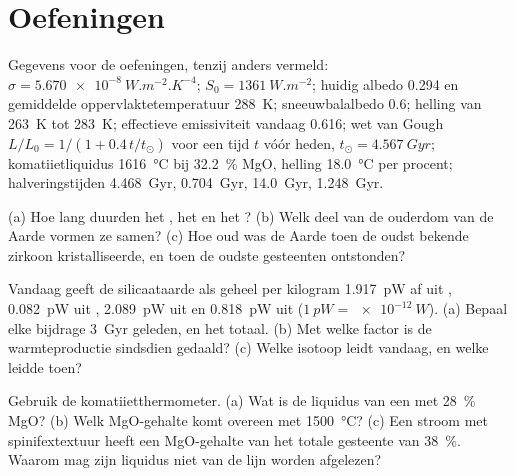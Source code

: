 \section*{Oefeningen}\label{sec:b2:precambrian-earth:exercises}

Gegevens voor de oefeningen, tenzij anders vermeld: $\sigma = \qty{5.670e-8}{W.m^{-2}.K^{-4}}$;
$S_0 = \qty{1361}{W.m^{-2}}$; huidig albedo 0.294 en gemiddelde oppervlaktetemperatuur \qty{288}{K};
sneeuwbalalbedo 0.6; helling van \qty{263}{K} tot \qty{283}{K}; effectieve emissiviteit vandaag
0.616; wet van Gough $L/L_0 = 1/(1 + 0.4\,t/t_\odot)$ voor een tijd $t$ vóór heden, $t_\odot =
\qty{4.567}{Gyr}$; komatiietliquidus \qty{1616}{\celsius} bij \qty{32.2}{\percent} MgO,
helling \qty{18.0}{\celsius} per procent; halveringstijden  \qty{4.468}{Gyr}, 
\qty{0.704}{Gyr},  \qty{14.0}{Gyr},  \qty{1.248}{Gyr}.

\begin{exercise}[$\star$]\label{exo:b2:precambrian-earth:1}
(a) Hoe lang duurden het , het  en het ? (b) Welk deel van de ouderdom
van de Aarde vormen ze samen? (c) Hoe oud was de Aarde toen de oudst bekende zirkoon
kristalliseerde, en toen de oudste gesteenten ontstonden?
\end{exercise}

\begin{exercise}[$\star$]\label{exo:b2:precambrian-earth:2}
Vandaag geeft de silicaataarde als geheel per kilogram \qty{1.917}{pW} af uit ,
\qty{0.082}{pW} uit , \qty{2.089}{pW} uit  en \qty{0.818}{pW} uit
 ($\qty{1}{pW} = \qty{e-12}{W}$). (a) Bepaal elke bijdrage \qty{3}{Gyr} geleden, en
het totaal. (b) Met welke factor is de warmteproductie sindsdien gedaald? (c) Welke isotoop leidt
vandaag, en welke leidde toen?
\end{exercise}

\begin{exercise}[$\star$]\label{exo:b2:precambrian-earth:3}
Gebruik de komatiietthermometer. (a) Wat is de liquidus van een  met
\qty{28}{\percent} MgO? (b) Welk MgO-gehalte komt overeen met \qty{1500}{\celsius}? (c) Een
stroom met spinifextextuur heeft een MgO-gehalte van het totale gesteente van \qty{38}{\percent}. Waarom mag zijn liquidus niet
van de lijn worden afgelezen?
\end{exercise}

